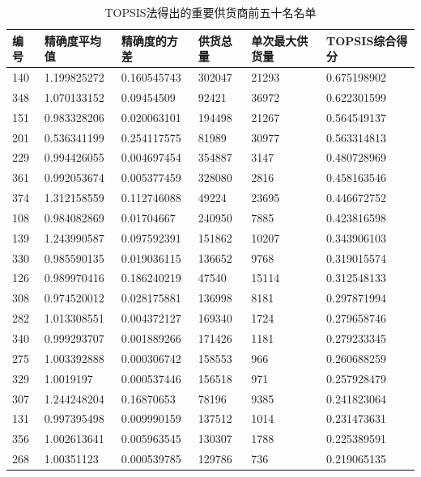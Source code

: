 \documentclass{cumcmthesis}
\begin{document}
    \begin{longtable}{l|llll|l}
        \caption{\newline TOPSIS法得出的重要供货商前五十名名单}
        \toprule

    编号  & 精确度平均值 & 精确度的方差  & 供货总量   & 单次最大供货量 & TOPSIS综合得分  \\
    \midrule
    140 & 1.199825272 & 0.160545743 & 302047 & 21293   & 0.675198902 \\
    348 & 1.070133152 & 0.09454509  & 92421  & 36972   & 0.622301599 \\
    151 & 0.983328206 & 0.020063101 & 194498 & 21267   & 0.564549137 \\
    201 & 0.536341199 & 0.254117575 & 81989  & 30977   & 0.563314813 \\
    229 & 0.994426055 & 0.004697454 & 354887 & 3147    & 0.480728969 \\
    361 & 0.992053674 & 0.005377459 & 328080 & 2816    & 0.458163546 \\
    374 & 1.312158559 & 0.112746088 & 49224  & 23695   & 0.446672752 \\
    108 & 0.984082869 & 0.01704667  & 240950 & 7885    & 0.423816598 \\
    139 & 1.243990587 & 0.097592391 & 151862 & 10207   & 0.343906103 \\
    330 & 0.985590135 & 0.019036115 & 136652 & 9768    & 0.319015574 \\
    126 & 0.989970416 & 0.186240219 & 47540  & 15114   & 0.312548133 \\
    308 & 0.974520012 & 0.028175881 & 136998 & 8181    & 0.297871994 \\
    282 & 1.013308551 & 0.004372127 & 169340 & 1724    & 0.279658746 \\
    340 & 0.999293707 & 0.001889266 & 171426 & 1181    & 0.279233345 \\
    275 & 1.003392888 & 0.000306742 & 158553 & 966     & 0.260688259 \\
    329 & 1.0019197   & 0.000537446 & 156518 & 971     & 0.257928479 \\
    307 & 1.244248204 & 0.16870653  & 78196  & 9385    & 0.241823064 \\
    131 & 0.997395498 & 0.009990159 & 137512 & 1014    & 0.231473631 \\
    356 & 1.002613641 & 0.005963545 & 130307 & 1788    & 0.225389591 \\
    268 & 1.00351123  & 0.000539785 & 129786 & 736     & 0.219065135 \\

\end{longtable}
\end{document}
